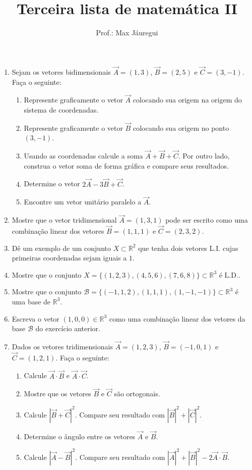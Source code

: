 \documentclass[a4paper]{article}
\title{Terceira lista de matemática II}
\author{Prof.: Max Jáuregui}
\date{}
\newcommand{\mc}{\mathcal}
\newcommand{\R}{\mathbb{R}}
\begin{document}
\maketitle
\begin{enumerate}
\item Sejam os vetores bidimensionais $\vec A=(1,3)$, $\vec B=(2,5)$ e $\vec C=(3,-1)$. Faça o seguinte:
\begin{enumerate}
	\item Represente graficamente o vetor $\vec A$ colocando sua origem na origem do sistema de coordenadas.
	\item Represente graficamente o vetor $\vec B$ colocando sua origem no ponto $(3,-1)$.
	\item Usando as coordenadas calcule a soma $\vec A+\vec B+\vec C$. Por outro lado, construa o vetor soma de forma gráfica e compare seus resultados.
	\item Determine o vetor $2\vec A-3\vec B+\vec C$.
	\item Encontre um vetor unitário paralelo a $\vec A$.
\end{enumerate}
\item Mostre que o vetor tridimensional $\vec A=(1,3,1)$ pode ser escrito como uma combinação linear dos vetores $\vec B=(1,1,1)$ e $\vec C=(2,3,2)$.
\item Dê um exemplo de um conjunto $X\subset\R^2$ que tenha dois vetores L.I. cujas primeiras coordenadas sejam iguais a $1$.
\item Mostre que o conjunto $X=\{(1,2,3),(4,5,6),(7,6,8)\}\subset\R^3$ é L.D..
\item Mostre que o conjunto $\mc B=\{(-1,1,2),(1,1,1),(1,-1,-1)\}\subset\R^3$ é uma base de $\R^3$.
\item Escreva o vetor $(1,0,0)\in\R^3$ como uma combinação linear dos vetores da base $\mc B$ do exercício anterior.
\item Dados os vetores tridimensionais $\vec A=(1,2,3)$, $\vec B=(-1,0,1)$ e $\vec C=(1,2,1)$. Faça o seguinte:
\begin{enumerate}
	\item Calcule $\vec A\cdot\vec B$ e $\vec A\cdot \vec C$.
	\item Mostre que os vetores $\vec B$ e $\vec C$ são ortogonais.
	\item Calcule $|\vec B+\vec C|^2$. Compare seu resultado com $|\vec B|^2+|\vec C|^2$.
	\item Determine o ângulo entre os vetores $\vec A$ e $\vec B$.
	\item Calcule $|\vec A-\vec B|^2$. Compare seu resultado com $|\vec A|^2+|\vec B|^2-2\vec A\cdot\vec B$.

\end{enumerate}
\end{enumerate}
\end{document}
